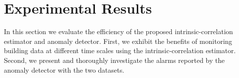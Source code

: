 
\section{Experimental Results}
In this section we evaluate the efficiency of the proposed intrinsic-correlation estimator and anomaly detector.
First, we exhibit the benefits of monitoring building data at different time scales using the intrinsic-correlation estimator.
Second, we present and thoroughly investigate the alarms reported by the anomaly detector with the two datasets.


\begin{figure}[t!]
\hfill
{}\\
\hfill

\end{figure}
